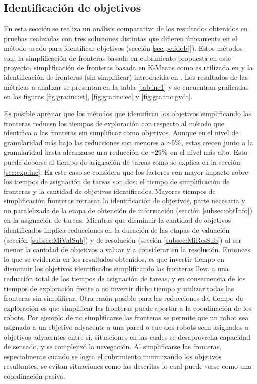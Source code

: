 \subsection{Identificación de objetivos}\label{sec:exp:idobj}
En esta sección se realiza un análisis comparativo de los resultados obtenidos
en pruebas realizadas con tres soluciones distintas que difieren únicamente en
el método usado para identificar objetivos (sección \ref{sec:pc:idobj}). Estos
métodos son: la simplificación de fronteras basada en cubrimiento propuesta en
este proyecto, simplificación de fronteras basada en K-Means como es utilizada en
\cite{Amorin2019} y la identificación de fronteras (sin simplificar)
introducida en \cite{yamauchi1998frontier}. Los resultados de las métricas a
analizar se presentan en la tabla \ref{tab:inc1} y se encuentran graficadas en
las figuras \ref{fig:gra:inc:et}, \ref{fig:gra:inc:ec} y
\ref{fig:gra:inc:gvdt}.

Es posible apreciar que los métodos que identifican los objetivos simplificando
las fronteras reducen los tiempos de exploración con respecto al método que
identifica a las fronteras sin simplificar como objetivos. Aunque en el nivel
de granularidad más bajo las reducciones son menores a ${\smallsim}5\%$, estas crecen junto
a la granularidad hasta alcanzarse una reducción de ${\smallsim}29\%$ en el
nivel más alto. Esto puede deberse al tiempo de asignación de tareas como se
explica en la sección \ref{sec:exp:inc}. En este caso se considera que los
factores con mayor impacto sobre los tiempos de asignación de tareas son dos:
el tiempo de simplificación de fronteras y la cantidad de objetivos
identificados. Mayores tiempos de simplificación fronteras retrasan la
identificación de objetivos, parte necesaria y no paralelizada de la etapa de
obtención de información (sección \ref{subsec:obtInfo}) en la asignación de
tareas. Mientras que disminuir la cantidad de objetivos identificados implica
reducciones en la duración de las etapas de valuación (sección
\ref{subsec:MiValSub}) y de resolución (sección \ref{subsec:MiResSub}) al ser
menor la cantidad de objetivos a valuar y a considerar en la resolución. Entonces lo que se evidencia
en los resultados obtenidos, es que invertir tiempo en disminuir los objetivos
identificados simplificando las fronteras lleva a una reducción total de los
tiempos de asignación de tareas, y en consecuencia de los tiempos de exploración
frente a no invertir dicho tiempo y utilizar todas las fronteras sin
simplificar. Otra razón posible para las reducciones del tiempo de exploración
es que simplificar las fronteras puede aportar a la coordinación de los robots.
Por ejemplo de no simplificarse las fronteras se permite que un robot sea
asignado a un objetivo adyacente a una pared o que dos robots sean asignados a
objetivos adyacentes entre sí, situaciones en las cuales se desaprovecha
capacidad de sensado, y se complejizó la navegación. Al simplificarse las
fronteras, especialmente cuando se logra el cubrimiento minimizando los
objetivos resultantes, se evitan situaciones como las descritas lo cual puede
verse como una coordinación pasiva. 


